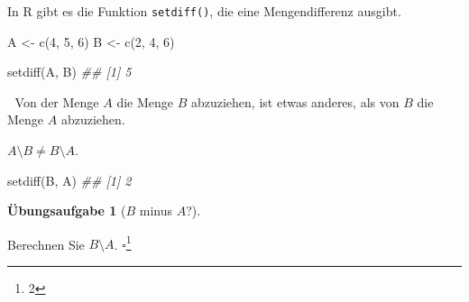 \documentclass[
  ngerman,
  letterpaper,
  twoside,
  open=any]{scrbook}
\newenvironment{Shaded}{\begin{snugshade}}{\end{snugshade}}
\newcommand{\DecValTok}[1]{\textcolor[rgb]{0.68,0.00,0.00}{#1}}
\newcommand{\DocumentationTok}[1]{\textcolor[rgb]{0.37,0.37,0.37}{\textit{#1}}}
\newcommand{\FunctionTok}[1]{\textcolor[rgb]{0.28,0.35,0.67}{#1}}
\newcommand{\NormalTok}[1]{\textcolor[rgb]{0.00,0.23,0.31}{#1}}
\newcommand{\OtherTok}[1]{\textcolor[rgb]{0.00,0.23,0.31}{#1}}
\theoremstyle{definition}
\theoremstyle{plain}
\theoremstyle{definition}
\newtheorem{exercise}{Übungsaufgabe}[chapter]
\theoremstyle{definition}
\theoremstyle{remark}
\begin{document}
In R gibt es die Funktion \texttt{setdiff()}, die eine Mengendifferenz
ausgibt.

\begin{Shaded}
\begin{Highlighting}[]
\NormalTok{A }\OtherTok{\textless{}{-}} \FunctionTok{c}\NormalTok{(}\DecValTok{4}\NormalTok{, }\DecValTok{5}\NormalTok{, }\DecValTok{6}\NormalTok{)}
\NormalTok{B }\OtherTok{\textless{}{-}} \FunctionTok{c}\NormalTok{(}\DecValTok{2}\NormalTok{, }\DecValTok{4}\NormalTok{, }\DecValTok{6}\NormalTok{)}

\FunctionTok{setdiff}\NormalTok{(A, B)}
\DocumentationTok{\#\# [1] 5}
\end{Highlighting}
\end{Shaded}

🤯 Von der Menge \(A\) die Menge \(B\) abzuziehen, ist etwas anderes,
als von \(B\) die Menge \(A\) abzuziehen.

\begin{tcolorbox}[enhanced jigsaw, arc=.35mm, bottomrule=.15mm, bottomtitle=1mm, breakable, colback=white, colbacktitle=quarto-callout-caution-color!10!white, colframe=quarto-callout-caution-color-frame, coltitle=black, left=2mm, leftrule=.75mm, opacityback=0, opacitybacktitle=0.6, rightrule=.15mm, title=\textcolor{quarto-callout-caution-color}{\faFire}\hspace{0.5em}{Vorsicht}, titlerule=0mm, toprule=.15mm, toptitle=1mm]

\(A \setminus B \ne B \setminus A\).

\end{tcolorbox}

\begin{Shaded}
\begin{Highlighting}[]
\FunctionTok{setdiff}\NormalTok{(B, A)}
\DocumentationTok{\#\# [1] 2}
\end{Highlighting}
\end{Shaded}

\begin{exercise}[\(B\) minus
\(A\)?]\protect\hypertarget{exr-setminus2}{}\label{exr-setminus2}

Berechnen Sie \(B \setminus A\). \(\square\)\footnote{2}

\end{exercise}
\end{document}
